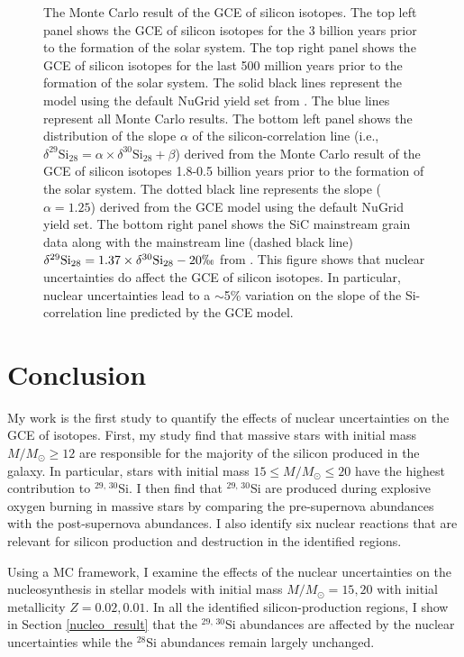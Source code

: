 \documentclass{brandeis-thesis3.2}
\def \msun {M_{\odot}}
\newcommand{\iso}[2]{$^{#1}${#2}}
\newcommand{\del}[3]{\delta^{#1}\text{#3}_{#2}}
\begin{document}
\begin{figure}[H]
    \caption{The Monte Carlo result of the GCE of silicon isotopes. The top left panel shows the GCE of silicon isotopes for the 3 billion years prior to the formation of the solar system. The top right panel shows the GCE of silicon isotopes for the last 500 million years prior to the formation of the solar system. The solid black lines represent the model using the default NuGrid yield set from \citealt{Ritter_2018}. The blue lines represent all Monte Carlo results. The bottom left panel shows the distribution of the slope $\alpha$ of the silicon-correlation line (i.e., $\del{29}{28}{Si} = \alpha \times \del{30}{28}{Si} + \beta$) derived from the Monte Carlo result of the GCE of silicon isotopes 1.8-0.5 billion years prior to the formation of the solar system. The dotted black line represents the slope ($\alpha = 1.25$) derived from the GCE model using the default NuGrid yield set. The bottom right panel shows the SiC mainstream grain data along with the mainstream line (dashed black line) $\del{29}{28}{Si} = 1.37 \times \del{30}{28}{Si} -20\permil$ from \cite{Zinner2007}. This figure shows that nuclear uncertainties do affect the GCE of silicon isotopes. In particular, nuclear uncertainties lead to a $\sim$5\% variation on the slope of the Si-correlation line predicted by the GCE model.}
    \label{fig:gce_result}
\end{figure}



\chapter{Conclusion} \label{conclusion}
My work is the first study to quantify the effects of nuclear uncertainties on the GCE of isotopes. First, my study find that massive stars with initial mass $M/\msun \geq 12$ are responsible for the majority of the silicon produced in the galaxy. In particular, stars with initial mass $15\leq M/\msun \leq 20$ have the highest contribution to \iso{29, \, 30}{Si}. I then find that \iso{29,\, 30}{Si} are produced during explosive oxygen burning in massive stars by comparing the pre-supernova abundances with the post-supernova abundances. I also identify six nuclear reactions that are relevant for silicon production and destruction in the identified regions. 

Using a MC framework, I examine the effects of the nuclear uncertainties on the nucleosynthesis in stellar models with initial mass $M/\msun = 15, 20$ with initial metallicity $Z=0.02, 0.01$. In all the identified silicon-production regions, I show in Section \ref{nucleo_result} that the \iso{29, \, 30}{Si} abundances are affected by the nuclear uncertainties while the \iso{28}{Si} abundances remain largely unchanged. 
\end{document}
